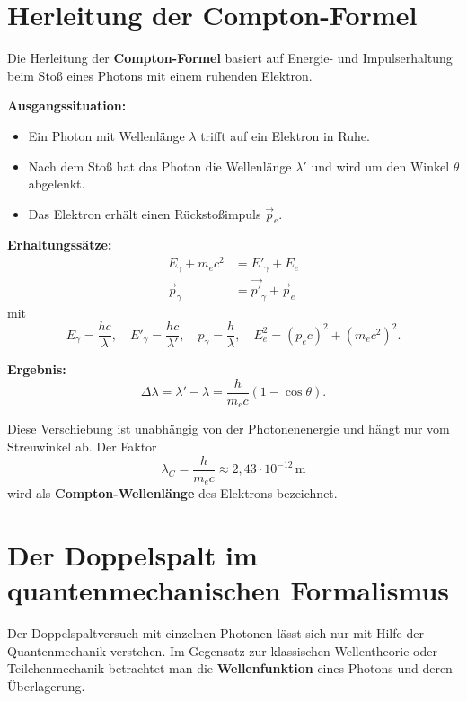 \section{Herleitung der Compton-Formel}
\label{anhangA:comptonHerleitung}

Die Herleitung der \textbf{Compton-Formel} basiert auf Energie- und Impulserhaltung beim Stoß eines Photons mit einem ruhenden Elektron. 

\textbf{Ausgangssituation:}
\begin{itemize}
	\item Ein Photon mit Wellenlänge \( \lambda \) trifft auf ein Elektron in Ruhe.
	\item Nach dem Stoß hat das Photon die Wellenlänge \( \lambda' \) und wird um den Winkel \( \theta \) abgelenkt.
	\item Das Elektron erhält einen Rückstoßimpuls \( \vec{p}_e \).
\end{itemize}

\textbf{Erhaltungssätze:}
\begin{align*}
	E_\gamma + m_e c^2 &= E'_\gamma + E_e \\
	\vec{p}_\gamma &= \vec{p'}_\gamma + \vec{p}_e
\end{align*}
mit
\[
E_\gamma = \frac{hc}{\lambda}, \quad 
E'_\gamma = \frac{hc}{\lambda'}, \quad 
p_\gamma = \frac{h}{\lambda}, \quad 
E_e^2 = (p_e c)^2 + (m_e c^2)^2.
\]

\textbf{Ergebnis:}
\[
\Delta \lambda = \lambda' - \lambda 
= \frac{h}{m_e c}(1 - \cos \theta).
\]

Diese Verschiebung ist unabhängig von der Photonenenergie und hängt nur vom Streuwinkel ab. Der Faktor
\[
\lambda_C = \frac{h}{m_e c} \approx 2{,}43 \cdot 10^{-12}\,\mathrm{m}
\]
wird als \textbf{Compton-Wellenlänge} des Elektrons bezeichnet.

\section{Der Doppelspalt im quantenmechanischen Formalismus}
\label{anhangA:doppelspalt}

Der Doppelspaltversuch mit einzelnen Photonen lässt sich nur mit Hilfe der Quantenmechanik verstehen. 
Im Gegensatz zur klassischen Wellentheorie oder Teilchenmechanik betrachtet man die \textbf{Wellenfunktion} 
eines Photons und deren Überlagerung.

